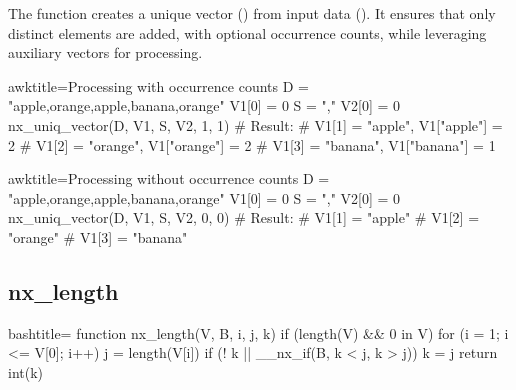 \begin{NexMainBox}
	\begin{NexMainBox}
		The  function creates a unique vector () from input data (). It ensures that only distinct elements are added, with optional occurrence counts, while leveraging auxiliary vectors for processing.
	\end{NexMainBox}
	\begin{NexMainBox}
		\begin{NexListDark}
		\end{NexListDark}
	\end{NexMainBox}
\end{NexMainBox}

\begin{NexCodeBox}{awk}{title={Processing with occurrence counts}}
	D = "apple,orange,apple,banana,orange"
	V1[0] = 0
	S = ","
	V2[0] = 0
	nx_uniq_vector(D, V1, S, V2, 1, 1)
	# Result:
	# V1[1] = "apple", V1["apple"] = 2
	# V1[2] = "orange", V1["orange"] = 2
	# V1[3] = "banana", V1["banana"] = 1
\end{NexCodeBox}

\begin{NexCodeBox}{awk}{title={Processing without occurrence counts}}
	D = "apple,orange,apple,banana,orange"
	V1[0] = 0
	S = ","
	V2[0] = 0
	nx_uniq_vector(D, V1, S, V2, 0, 0)
	# Result:
	# V1[1] = "apple"
	# V1[2] = "orange"
	# V1[3] = "banana"
\end{NexCodeBox}


\newpage
\subsection{nx_length}
\label{nx_length}
\begin{NexCodeBox}{bash}{title={}}
function nx_length(V, B,	i, j, k)
{
	if (length(V) && 0 in V) {
		for (i = 1; i <= V[0]; i++) {
			j = length(V[i])
			if (! k || __nx_if(B, k < j, k > j))
				k = j
		}
		return int(k)
	}
}
\end{NexCodeBox}

